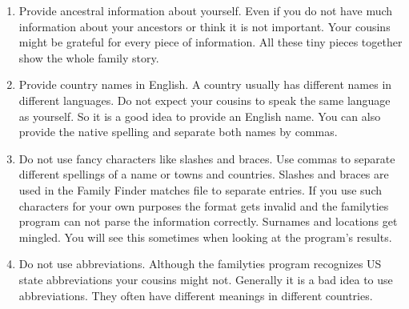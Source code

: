 \documentclass[12pt,a4paper]{article}
\begin{document}
\begin{enumerate}
\item Provide ancestral information about yourself. Even if
  you do not have much information about your ancestors or
  think it is not important. Your cousins might be grateful
  for every piece of information. All these tiny pieces
  together show the whole family story.

\item Provide country names in English. A country usually has
  different names in different languages. Do not expect your
  cousins to speak the same language as yourself. So it is a
  good idea to provide an English name. You can also provide
  the native spelling and separate both names by commas.

\item Do not use fancy characters like slashes and braces.
  Use commas to separate different spellings of a name or
  towns and countries. Slashes and braces are used in the
  Family Finder matches file to separate entries. If you 
  use such characters for your own purposes the format gets
  invalid and the familyties program can not parse the
  information correctly. Surnames and locations get mingled.
  You will see this sometimes when looking at the
  program's results.

\item Do not use abbreviations. Although the familyties
  program recognizes US state abbreviations your cousins
  might not. Generally it is a bad idea to use abbreviations.
  They often have different meanings in different countries.
\end{enumerate}
\end{document}
